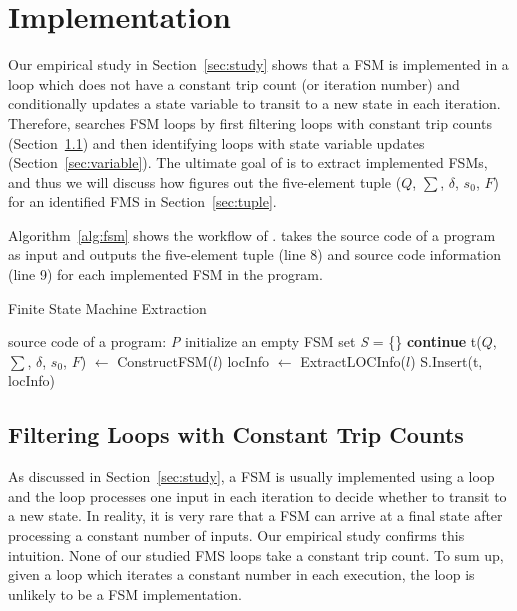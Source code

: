 \section{Implementation}
\label{sec:impl}

Our empirical study in Section~\ref{sec:study} 
shows that a FSM is implemented in a loop 
which does not have a constant trip count (or iteration number) 
and conditionally updates a state variable 
to transit to a new state in each iteration. 
Therefore, \Tool{} searches FSM loops
by first filtering loops with constant trip counts (Section~\ref{sec:constant}) 
and then identifying loops with state variable updates (Section~\ref{sec:variable}).
The ultimate goal of \Tool{} is to extract implemented FSMs, 
and thus we will discuss how \Tool{} figures out the five-element tuple 
($Q$, $\sum$, $\delta$, $s_0$, $F$) 
for an identified FMS in Section~\ref{sec:tuple}. 

Algorithm~\ref{alg:fsm} shows the workflow of \Tool{}.
\Tool{} takes the source code of a program as input
and outputs the five-element tuple (line 8) 
and source code information (line 9) for each 
implemented FSM in the program.  


\begin{algorithm}[!htb]
    \caption{Finite State Machine Extraction}
    \label{alg:fsm}
    \begin{algorithmic}[1]
        \Require source code of a program: \emph{P}
        \State initialize an empty FSM set \emph{S} = \{\}
        		\State \textbf{continue}
        	\EndIf
        			\State t($Q$, $\sum$, $\delta$, $s_0$, $F$) $\gets$ ConstructFSM($l$)
        			\State locInfo $\gets$ ExtractLOCInfo($l$) 
        			\State S.Insert(t, locInfo)
        	\EndIf
        \EndFor
        \State {}
        \EndFunction
    \end{algorithmic}
\end{algorithm}


\subsection{Filtering Loops with Constant Trip Counts}
\label{sec:constant}
As discussed in Section~\ref{sec:study},
a FSM is usually implemented using a loop 
and the loop processes one input in each iteration to decide 
whether to transit to a new state. 
In reality, it is very rare that a FSM can arrive at a final state 
after processing a constant number of inputs.
Our empirical study confirms this intuition. 
None of our studied FMS loops take a constant trip count.  
To sum up, given a loop which iterates a constant 
number in each execution, 
the loop is unlikely to be a FSM implementation. 

